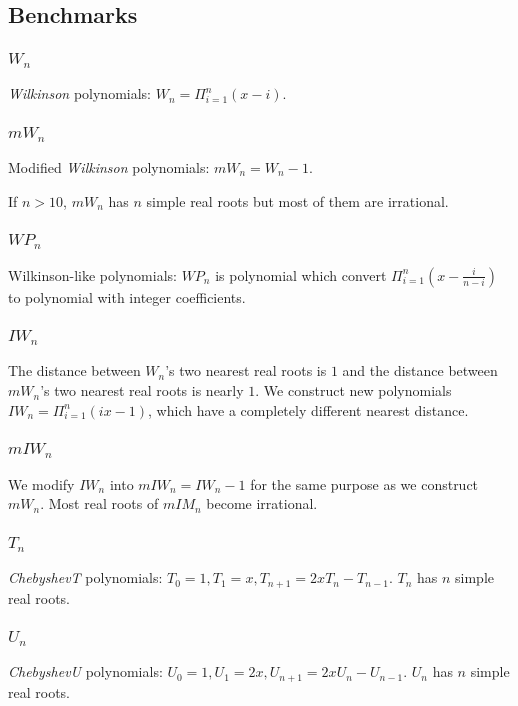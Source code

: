 \subsection{Benchmarks }
 \subsubsection{$W_n$}
 {\it Wilkinson} polynomials: $W_n=\Pi_{i=1}^n(x-i)$. %
  \subsubsection{$mW_n$}
  Modified {\it Wilkinson} polynomials: $mW_n=W_n-1$.

  If $n>10$, $mW_n$ has $n$ simple real roots but most of them are irrational.
   \subsubsection{$WP_n$}
   Wilkinson-like polynomials: $WP_n$  is polynomial which convert $\Pi_{i=1}^n(x-\frac{i}{n-i})$ to polynomial with integer coefficients.
 \subsubsection{$IW_n$}
 The distance between  $W_n$'s two  nearest real roots  is  $1$ and the distance between $mW_n$'s two nearest real roots  is nearly $1$. %
 We construct new polynomials $IW_n=\Pi_{i=1}^n(ix-1)$, which have a completely different nearest distance. %
 \subsubsection{$ mIW_n$ }
 We modify $IW_n$  into $mIW_n=IW_n-1$ for the same purpose  as we construct $mW_n$. Most real roots of $mIM_n$  become irrational.
 \subsubsection{$T_n$} {\it ChebyshevT} polynomials: $T_0=1,T_1=x,T_{n+1}=2xT_n-T_{n-1}$. $T_n$ has $n$ simple real roots.
 \subsubsection{$U_n$} {\it ChebyshevU} polynomials: $U_0=1,U_1=2x,U_{n+1}=2xU_n-U_{n-1}$. $U_n$ has $n$ simple real roots.
